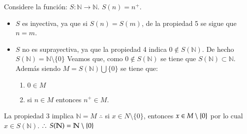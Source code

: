     Considere la función: $ S : \mathbb{N} \rightarrow \mathbb{N}$. $S(n)=n^+$.
    \\
    \begin{itemize}
        \item $S$ es inyectiva, ya que si $S(n)= S(m)$, de la propiedad
            5 se sigue que $n=m$.
        \item $S$ no es suprayectiva, ya que la propiedad 4 indica $0 \notin
            S(\mathbb{N})$. De hecho $S(\mathbb{N}) = \mathbb{N} \setminus \{0\}$
            Veamos que, como $0\notin S(\mathbb{N})$ se tiene que $S(\mathbb{N})
            \subset \mathbb{N}$. \\
            Además siendo $M=S(\mathbb{N})\bigcup\{0\}$ se tiene que:
            \begin{enumerate}
                \item $0 \in M$
                \item si $n \in M$ entonces $n^+ \in M$.
            \end{enumerate}
    \end{itemize}
    
    La propiedad 3 implica $\mathbb{N}=M$ $\therefore$ si $x \in N\setminus \{0\}$, entonces
    $x \in  M\setminus \{0\}$ por lo cual $x \in S(\mathbb{N})$. $\therefore
    \, S(\mathbb{N}) = \mathbb{N} \setminus \{0\}$\\


